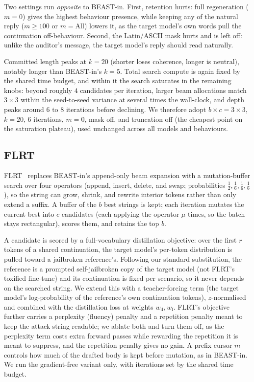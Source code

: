 \documentclass{article}
\theoremstyle{plain}
\theoremstyle{definition}
\theoremstyle{remark}
\begin{document}
Two settings run \emph{opposite} to BEAST-in. First, retention hurts: full regeneration ($m = 0$) gives the highest behaviour presence, while keeping any of the natural reply ($m \ge 100$ or $m = \text{All}$) lowers it, as the target model's own words pull the continuation off-behaviour. Second, the Latin/ASCII mask hurts and is left off: unlike the auditor's message, the target model's reply should read naturally.

Committed length peaks at $k = 20$ (shorter loses coherence, longer is neutral), notably longer than BEAST-in's $k = 5$. Total search compute is again fixed by the shared time budget, and within it the search saturates in the remaining knobs: beyond roughly $4$ candidates per iteration, larger beam allocations match $3 \times 3$ within the seed-to-seed variance at several times the wall-clock, and depth peaks around $6$ to $8$ iterations before declining. We therefore adopt $b \times c = 3 \times 3$, $k = 20$, $6$ iterations, $m = 0$, mask off, and truncation off (the cheapest point on the saturation plateau), used unchanged across all models and behaviours.

\subsection{FLRT}
FLRT~\citep{thompson2024flrt} replaces BEAST-in's append-only beam expansion with a mutation-buffer search over four operators (append, insert, delete, and swap; probabilities $\tfrac12, \tfrac16, \tfrac16, \tfrac16$), so the string can grow, shrink, and rewrite interior tokens rather than only extend a suffix. A buffer of the $b$ best strings is kept; each iteration mutates the current best into $c$ candidates (each applying the operator $\mu$ times, so the batch stays rectangular), scores them, and retains the top $b$.

A candidate is scored by a full-vocabulary distillation objective: over the first $r$ tokens of a shared continuation, the target model's per-token distribution is pulled toward a jailbroken reference's. Following our standard substitution, the reference is a prompted self-jailbroken copy of the target model (not FLRT's toxified fine-tune) and its continuation is fixed per scenario, so it never depends on the searched string. We extend this with a teacher-forcing term (the target model's log-probability of the reference's own continuation tokens), $z$-normalised and combined with the distillation loss at weights $w_{\mathrm d}, w_{\mathrm f}$. FLRT's objective further carries a perplexity (fluency) penalty and a repetition penalty meant to keep the attack string readable; we ablate both and turn them off, as the perplexity term costs extra forward passes while rewarding the repetition it is meant to suppress, and the repetition penalty gives no gain. A prefix cursor $m$ controls how much of the drafted body is kept before mutation, as in BEAST-in. We run the gradient-free variant only, with iterations set by the shared time budget.
\end{document}
